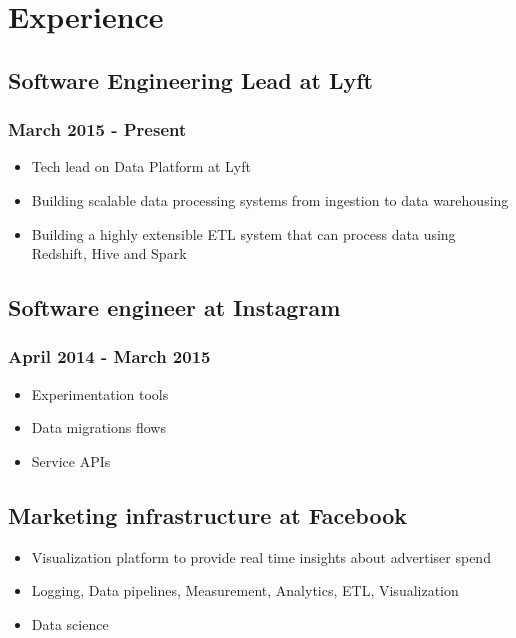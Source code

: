 \documentclass[letterpaper]{article}
\date{\today}
\title{}
\begin{document}

\section{Experience}
\label{sec:Experience}
\subsection{Software Engineering Lead at Lyft}
\label{sec:Software-Engineering-Lead-at-Lyft}
\subsubsection{March 2015 - Present}
\label{sec:March-2015-Present}
\begin{itemize}
\item Tech lead on Data Platform at Lyft
\item Building scalable data processing systems from ingestion to data warehousing
\item Building a highly extensible ETL system that can process data using Redshift, Hive and Spark
\end{itemize}
\subsection{Software engineer at Instagram}
\label{sec:Software-engineer-at-Instagram}
\subsubsection{April 2014 - March 2015}
\label{sec:April-2014-March-2015}
\begin{itemize}
\item Experimentation tools
\item Data migrations flows
\item Service APIs
\end{itemize}
\subsection{Marketing infrastructure at Facebook}
\label{sec:Marketing-infrastructure-at-Facebook}
\begin{itemize}
\item Visualization platform to provide real time insights about advertiser spend
\item Logging, Data pipelines, Measurement, Analytics, ETL, Visualization
\item Data science
\end{itemize}
\end{document}
